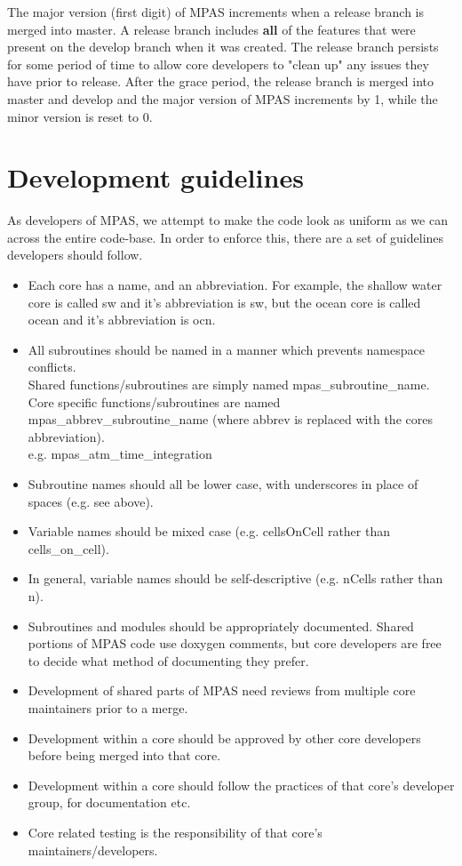 \documentclass[11pt]{report}
\begin{document}
The major version (first digit) of MPAS increments when a release branch is
merged into master. A release branch includes {\bf all} of the features that
were present on the develop branch when it was created. The release branch
persists for some period of time to allow core developers to "clean up" any
issues they have prior to release. After the grace period, the release branch
is merged into master and develop and the major version of MPAS increments by
1, while the minor version is reset to 0.


\chapter{Development guidelines}
\label{chap:code-guidelines}
As developers of MPAS, we attempt to make the code look as uniform as we can
across the entire code-base. In order to enforce this, there are a set of
guidelines developers should follow.

\begin{itemize}
	\item Each core has a name, and an abbreviation. For example, the shallow water core is called sw and it's abbreviation is sw, but the ocean core is called ocean and it's abbreviation is ocn.
	\item All subroutines should be named in a manner which prevents namespace conflicts. \\ 
		  Shared functions/subroutines are simply named mpas\_subroutine\_name.\\ 
		  Core specific functions/subroutines are named mpas\_abbrev\_subroutine\_name (where abbrev is replaced with the cores abbreviation). \\
		  e.g. mpas\_atm\_time\_integration
    \item Subroutine names should all be lower case, with underscores in place of spaces (e.g. see above).
	\item Variable names should be mixed case (e.g. cellsOnCell rather than cells\_on\_cell).
	\item In general, variable names should be self-descriptive (e.g. nCells rather than n).
	\item Subroutines and modules should be appropriately documented. Shared portions of MPAS code use doxygen comments, but core developers are free to decide what method of documenting they prefer.
	\item Development of shared parts of MPAS need reviews from multiple core maintainers prior to a merge.
	\item Development within a core should be approved by other core developers before being merged into that core.
	\item Development within a core should follow the practices of that core's developer group, for documentation etc.
	\item Core related testing is the responsibility of that core's maintainers/developers.
\end{itemize}
\end{document}
